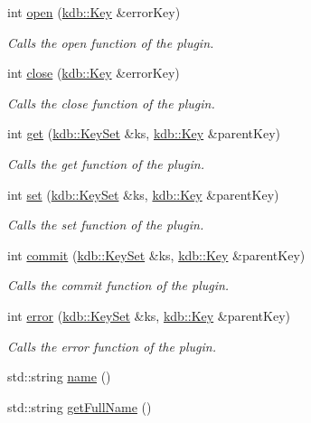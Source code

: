 \begin{DoxyCompactItemize}
int \mbox{\hyperlink{classkdb_1_1tools_1_1Plugin_a680a490123b5290441d76ef2c1e3f1fa}{open}} (\mbox{\hyperlink{classkdb_1_1Key}{kdb\+::\+Key}} \&error\+Key)
\begin{DoxyCompactList}\small\item\em Calls the open function of the plugin. \end{DoxyCompactList}\item 
int \mbox{\hyperlink{classkdb_1_1tools_1_1Plugin_a40b5fd413f3f6da735680ed8d7c8a6a2}{close}} (\mbox{\hyperlink{classkdb_1_1Key}{kdb\+::\+Key}} \&error\+Key)
\begin{DoxyCompactList}\small\item\em Calls the close function of the plugin. \end{DoxyCompactList}\item 
int \mbox{\hyperlink{classkdb_1_1tools_1_1Plugin_a2aa6ff55f9cf81a59d2a8d271fe68e0f}{get}} (\mbox{\hyperlink{classkdb_1_1KeySet}{kdb\+::\+Key\+Set}} \&ks, \mbox{\hyperlink{classkdb_1_1Key}{kdb\+::\+Key}} \&parent\+Key)
\begin{DoxyCompactList}\small\item\em Calls the get function of the plugin. \end{DoxyCompactList}\item 
int \mbox{\hyperlink{classkdb_1_1tools_1_1Plugin_abf84d512b48f6fa1b89636217537cde0}{set}} (\mbox{\hyperlink{classkdb_1_1KeySet}{kdb\+::\+Key\+Set}} \&ks, \mbox{\hyperlink{classkdb_1_1Key}{kdb\+::\+Key}} \&parent\+Key)
\begin{DoxyCompactList}\small\item\em Calls the set function of the plugin. \end{DoxyCompactList}\item 
int \mbox{\hyperlink{classkdb_1_1tools_1_1Plugin_ac1a731f0fa0628a51ca9edf6385e8c3d}{commit}} (\mbox{\hyperlink{classkdb_1_1KeySet}{kdb\+::\+Key\+Set}} \&ks, \mbox{\hyperlink{classkdb_1_1Key}{kdb\+::\+Key}} \&parent\+Key)
\begin{DoxyCompactList}\small\item\em Calls the commit function of the plugin. \end{DoxyCompactList}\item 
int \mbox{\hyperlink{classkdb_1_1tools_1_1Plugin_a8ec348b49a34ef17fda64cb289b8cf64}{error}} (\mbox{\hyperlink{classkdb_1_1KeySet}{kdb\+::\+Key\+Set}} \&ks, \mbox{\hyperlink{classkdb_1_1Key}{kdb\+::\+Key}} \&parent\+Key)
\begin{DoxyCompactList}\small\item\em Calls the error function of the plugin. \end{DoxyCompactList}\item 
std\+::string \mbox{\hyperlink{classkdb_1_1tools_1_1Plugin_ae4b82f943d0cdb0dd355924aa3201d6f}{name}} ()
\item 
std\+::string \mbox{\hyperlink{classkdb_1_1tools_1_1Plugin_acbe982e7bbb71aafb49b0d632e8650c9}{get\+Full\+Name}} ()
\end{DoxyCompactItemize}
